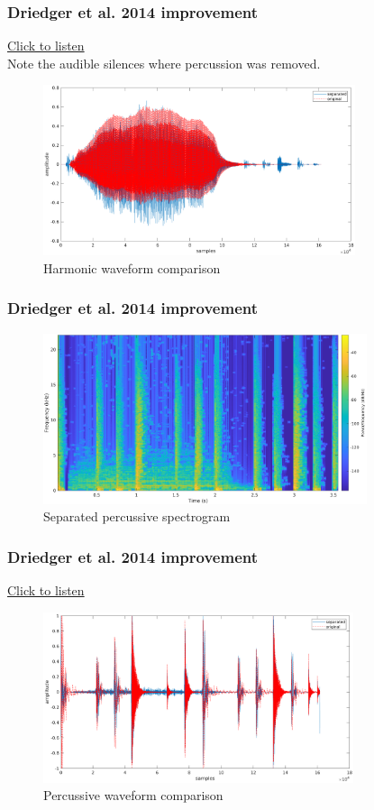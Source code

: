 \documentclass{beamer}
\begin{document}
\begin{frame}
	\frametitle{Driedger et al. 2014 improvement}
	\href{run:../audio/harm_driedger_nonrealtime.wav}{Click to listen}\\
	Note the audible silences where percussion was removed.
	\begin{figure}
	\includegraphics[height=5cm]{../images/harm_driedger_cmp.png}
		\caption{Harmonic waveform comparison}
	\end{figure}
\end{frame}

\begin{frame}
	\frametitle{Driedger et al. 2014 improvement}
	\begin{figure}
	\includegraphics[height=5cm]{../images/perc_binary.png}
		\caption{Separated percussive spectrogram}
	\end{figure}
\end{frame}

\begin{frame}
	\frametitle{Driedger et al. 2014 improvement}
	\href{run:../audio/perc_driedger_nonrealtime.wav}{Click to listen}\\
	\begin{figure}
	\includegraphics[height=5cm]{../images/perc_driedger_cmp.png}
		\caption{Percussive waveform comparison}
	\end{figure}
\end{frame}
\end{document}
